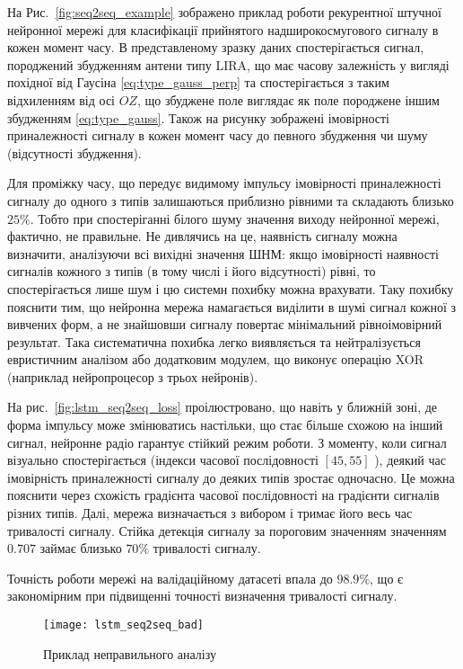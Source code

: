 На Рис.~\ref{fig:seq2seq_example} зображено приклад роботи рекурентної 
штучної нейронної мережі для класифікації прийнятого надширокосмугового сигналу 
в кожен момент часу. В представленому зразку даних спостерігається сигнал,
породжений збудженням антени типу LIRA, що має часову залежність у вигляді 
похідної від Гаусіна \eqref{eq:type_gauss_perp} та спостерігається з 
таким відхиленням від осі $ OZ $, що збуджене поле виглядає як поле породжене 
іншим збудженням \eqref{eq:type_gauss}. Також на рисунку зображені 
імовірності приналежності сигналу в кожен момент часу до певного збудження 
чи шуму (відсутності збудження).

Для проміжку часу, що передує видимому імпульсу імовірності приналежності 
сигналу до одного з типів залишаються 
приблизно рівними та складають близько $ 25 \% $. Тобто при спостеріганні 
білого шуму значення виходу нейронної мережі, фактично, не правильне. Не 
дивлячись на це, наявність сигналу можна визначити, аналізуючи всі вихідні 
значення ШНМ: якщо імовірності наявності сигналів кожного з типів (в тому 
числі і його відсутності) рівні, то спостерігається лише шум і цю системн 
похибку можна врахувати. Таку похибку пояснити тим, що нейронна мережа 
намагається виділити в шумі сигнал кожної з вивчених форм, а не знайшовши 
сигналу повертає мінімальний рівноімовірний результат. Така систематична 
похибка легко виявляється та нейтралізується евристичним аналізом або 
додатковим модулем, що виконує операцію XOR (наприклад нейропроцесор з 
трьох нейронів).

На рис.~\ref{fig:lstm_seq2seq_loss} проілюстровано, що навіть у ближній зоні, 
де форма імпульсу може змінюватись настільки, що стає більше схожою на інший 
сигнал, нейронне радіо гарантує стійкий режим роботи. З моменту, коли сигнал 
візуально спостерігається (індекси часової послідовності 
$ \left[ 45, 55 \right]$ ), деякий час імовірність приналежності сигналу до 
деяких типів зростає одночасно. Це можна пояснити через схожість 
градієнта часової послідовності на градієнти сигналів різних типів. Далі, 
мережа визначається з вибором і тримає його весь час тривалості сигналу. 
Стійка детекція сигналу за пороговим значенням значенням $ 0.707 $ займає 
близько $ 70\% $ тривалості сигналу.

Точність роботи мережі на валідаційному датасеті впала до $ 98.9\% $,
що є закономірним при підвищенні точності визначення тривалості сигналу.

\begin{figure}[htbp] \begin{center}
\texttt{[image: lstm\_seq2seq\_bad]}
\caption{Приклад неправильного аналізу} \label{fig:lstm_seq2seq_bad}
\end{center} \end{figure}

